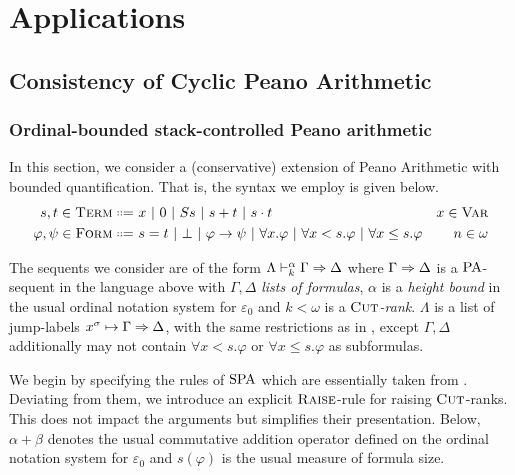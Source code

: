 
\chapter{Applications}
\label{chap:applications}

\section{Consistency of Cyclic Peano Arithmetic}
\label{sec:cons-of-cha}

\subsection{Ordinal-bounded stack-controlled Peano arithmetic}
\label{sec:ord-spa}

In this section, we consider a (conservative) extension of Peano Arithmetic with
bounded quantification. That is, the syntax we employ is given below.
\begin{align*}
  s,t \in \term \langeq &~ x ~|~ 0 ~|~ S s ~|~ s + t ~|~ s \cdot t  & x \in \var \\
  \varphi, \psi \in \form \langeq &~ s = t ~|~ \bot ~|~ \varphi \to \psi ~|~ \forall x.\varphi ~|~
                \forall x < s. \varphi ~|~ \forall x \leq s. \varphi & n \in \omega
\end{align*}

The sequents we consider are of the form $\Lambda \vdash^\alpha_k \Gamma \Rightarrow
\Delta$ where $\Gamma \Rightarrow \Delta$ is a $\mathrm{PA}$-sequent in the language above
with $\Gamma, \Delta$ \emph{lists of formulas},
 $\alpha$ is a \emph{height bound} in the
usual ordinal notation system for $\varepsilon_0$ and $k < \omega$ is a
\emph{$\textsc{Cut}$-rank}. $\Lambda$ is a list of jump-labels $x^\sigma \mapsto \Gamma
\Rightarrow \Delta$, with the same restrictions as in \needcite{}, except $\Gamma,
\Delta$ additionally may not contain $\forall x < s. \varphi$ or $\forall x \leq
s. \varphi$ as subformulas.

We begin by specifying the rules of $\mathrm{SPA}$  which are
essentially taken from \parencite{mancosuIntroductionProofTheory2021}.
Deviating from them, we introduce an explicit $\textsc{Raise}$-rule
for raising $\textsc{Cut}$-ranks. This does not impact the arguments but simplifies
their presentation.
Below, $\alpha + \beta$ denotes the usual commutative addition operator defined on the
ordinal notation system for $\varepsilon_0$ and $s(\varphi)$ is the usual
measure of formula size.

